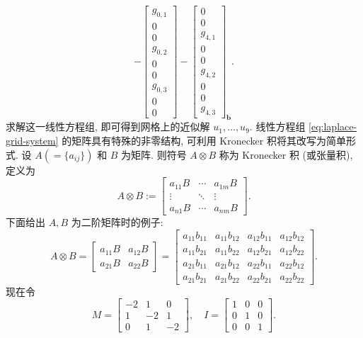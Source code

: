 \begin{equation}
{-\begin{bmatrix}g_{0,1}\\0\\0\\g_{0,2}\\0\\0\\g_{0,3}\\0\\0\end{bmatrix}
-\begin{bmatrix}0\\0\\g_{4,1}\\0\\0\\g_{4,2}\\0\\0\\g_{4,3}\end{bmatrix}}_{\boldsymbol{b}}.
\end{equation}
{求解这一线性方程组, 即可得到网格上的近似解 $u_1,\ldots,u_9$.}
{线性方程组 \eqref{eq:laplace-grid-system} 的矩阵具有特殊的非零结构, 可利用 Kronecker 积将其改写为简单形式. 设 $A(=\{a_{ij}\})$ 和 $B$ 为矩阵. 则符号 $A\otimes B$ 称为 Kronecker 积 (或张量积), 定义为}
\begin{equation}\label{eq:kronecker-product-definition}
A\otimes B:=\begin{bmatrix}a_{11}B&\cdots&a_{1m}B\\\vdots&\ddots&\vdots\\a_{n1}B&\cdots&a_{nm}B\end{bmatrix}.
\end{equation}
{下面给出 $A,B$ 为二阶矩阵时的例子:}
\[A\otimes B=\left[\begin{array}{c|c}a_{11}B&a_{12}B\\\hline a_{21}B&a_{22}B\end{array}\right]
=\left[\begin{array}{cc|cc}
a_{11}b_{11}&a_{11}b_{12}&a_{12}b_{11}&a_{12}b_{12}\\
a_{11}b_{21}&a_{11}b_{22}&a_{12}b_{21}&a_{12}b_{22}\\\hline
a_{21}b_{11}&a_{21}b_{12}&a_{22}b_{11}&a_{22}b_{12}\\
a_{21}b_{21}&a_{21}b_{22}&a_{22}b_{21}&a_{22}b_{22}
\end{array}\right].\]
{现在令}
\[M=\begin{bmatrix}-2&1&0\\1&-2&1\\0&1&-2\end{bmatrix},\quad I=\begin{bmatrix}1&0&0\\0&1&0\\0&0&1\end{bmatrix}.\]

